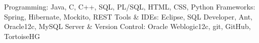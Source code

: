 \begin{cvskills}
  \cvskill
    {Programming:}
    {Java, C, C++, SQL, PL/SQL, HTML, CSS, Python}
  \cvskill
    {Frameworks:}
    {Spring, Hibernate, Mockito, REST}
  \cvskill
    {Tools \& IDEs:}
    {Eclipse, SQL Developer, Ant, Oracle12c, MySQL}
  \cvskill
    {Server \& Version Control:}
    {Oracle Weblogic12c, git, GitHub, TortoiseHG}
\end{cvskills}